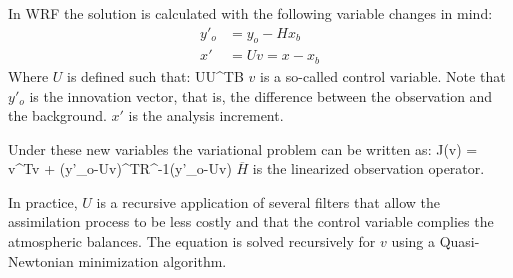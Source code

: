 In WRF the solution is calculated with the following variable changes in mind:
\begin{align}
y'_o &= y_o - Hx_b\\
x'&=Uv=x-x_b
\end{align}
Where $U$ is defined such that:
\be
UU^T\approx B
\ee
$v$ is a so-called control variable. Note that $y'_o$ is the innovation vector, that is, the difference between the observation and the background. $x'$ is the analysis increment.

Under these new variables the variational problem can be written as:
\be 
J(v) = v^Tv + (y'_o-Uv)^TR^{-1}(y'_o-Uv)
\ee
$\overline{H}$ is the linearized observation operator.

In practice, $U$ is a recursive application of several filters that allow the assimilation process to be less costly and that the control variable complies the atmospheric balances. The equation is solved recursively for $v$ using a Quasi-Newtonian minimization algorithm.  

